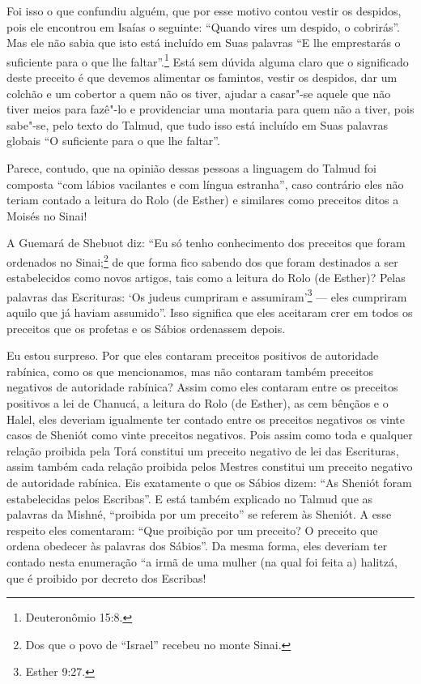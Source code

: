Foi isso o que confundiu alguém, que por esse motivo contou vestir os
despidos, pois ele encontrou em Isaías o seguinte: ``Quando vires um
despido, o cobrirás''. Mas ele não sabia que isto está incluído em Suas
palavras ``E lhe emprestarás o suficiente para o que lhe faltar''.\footnote{Deuteronômio 15:8.} Está sem dúvida alguma claro que o significado
deste preceito é que devemos alimentar os famintos, vestir os despidos,
dar um colchão e um cobertor a quem não os tiver, ajudar a casar"-se
aquele que não tiver meios para fazê"-lo e providenciar uma montaria
para quem não a tiver, pois sabe"-se, pelo texto do Talmud\starr, que tudo
isso está incluído em Suas palavras globais ``O suficiente para o que
lhe faltar''.

Parece, contudo, que na opinião dessas pessoas a linguagem do Talmud\starr{}
foi composta ``com lábios vacilantes e com língua estranha'', caso
contrário eles não teriam contado a leitura do Rolo (de Esther) e
similares como preceitos ditos a Moisés no Sinai!

A Guemará\starr{} de Shebuot\starr{} diz: ``Eu só tenho conhecimento dos preceitos que foram ordenados no Sinai;\footnote{Dos que o povo de ``Israel'' recebeu no monte Sinai.} de que forma fico sabendo dos que foram
destinados a ser estabelecidos como novos artigos, tais como a leitura
do Rolo
(de Esther)? Pelas palavras das Escrituras: `Os judeus cumpriram e
assumiram'\footnote{Esther 9:27.} --- eles cumpriram aquilo que já haviam
assumido''. Isso significa que eles aceitaram crer em todos os preceitos
que os profetas e os Sábios ordenassem depois.

Eu estou surpreso. Por que eles contaram preceitos positivos de
autoridade rabínica, como os que mencionamos, mas não contaram também
preceitos negativos de autoridade rabínica? Assim como eles contaram
entre os preceitos positivos a lei de Chanucá\starr, a leitura do Rolo (de
Esther), as cem bênçãos e o Halel\starr, eles deveriam igualmente ter
contado entre os preceitos negativos os vinte casos de
Sheniót\starr{} como vinte preceitos negativos. Pois
assim como toda e qualquer relação proibida pela Torá\starr{} constitui um
preceito negativo de lei das Escrituras, assim também cada relação
proibida pelos Mestres constitui um preceito negativo de autoridade
rabínica. Eis exatamente o que os Sábios dizem: ``As
Sheniót\starr{} foram estabelecidas pelos Escribas''. E
está também explicado no Talmud\starr{} que as palavras da Mishné,
``proibida por um preceito'' se referem às Sheniót\starr. A esse respeito
eles comentaram: ``Que proibição por um preceito? O preceito que ordena
obedecer às palavras dos Sábios''. Da mesma forma, eles deveriam ter
contado nesta enumeração ``a irmã de uma mulher (na qual foi feita a)
halitzá\starr, que é proibido por decreto dos Escribas!

